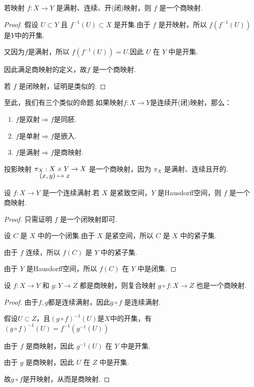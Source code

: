 \begin{proposition}[][prop:8.2]
    若映射 $f:X\to Y$ 是满射、连续、开(闭)映射，则 $f$ 是一个商映射.
\end{proposition}
\begin{proof}
    假设 $U\subset Y$ 且 $f^{-1}(U)\subset X$ 是开集.由于 $f$ 是开映射，所以 $f(f^{-1}(U))$是$Y$中的开集.\par
    又因为$f$是满射，所以 $f(f^{-1}(U))=U$.因此 $U$ 在 $Y$ 中是开集.\par
    因此满足商映射的定义，故$f$ 是一个商映射.
    \par
    若 $f$ 是闭映射，证明是类似的.
\end{proof}
\begin{remark}
    至此，我们有三个类似的命题.如果映射$f:X\to Y$是连续开(闭)映射，那么：
    \begin{enumerate}
        \item $f$是双射$\Rightarrow f$是同胚.
        \item $f$是单射$\Rightarrow f$是嵌入.
        \item $f$是满射$\Rightarrow f$是商映射.
    \end{enumerate}
\end{remark}

\begin{instance}
    投影映射 $\setjot[-2]\begin{aligned}[t]
        \pi_X:X&\times Y\to X \\
        (x,y)&\mapsto x
    \end{aligned} $ 是一个商映射，因为 $\pi_X$ 是满射、连续且开的.
\end{instance}

\begin{proposition}[][prop:8.3]
    设 $f:X\to Y$ 是一个连续满射.若 $X$ 是紧致空间，$Y$ 是Hausdorff空间，则 $f$ 是一个商映射.
\end{proposition}
\begin{proof}
    只需证明 $f$ 是一个闭映射即可.
    \par
    设 $C$ 是 $X$ 中的一个闭集.由于 $X$ 是紧空间，所以 $C$ 是 $X$ 中的紧子集.
    \par
    由于 $f$ 连续，所以 $f(C)$ 是 $Y$ 中的紧子集.
    \par
    由于 $Y$ 是Hausdorff空间，所以 $f(C)$ 在 $Y$ 中是闭集.
\end{proof}

\begin{lemma}[][lem:8.3]
    设 $f:X\to Y$ 和 $g:Y\to Z$ 都是商映射，则复合映射 $g\circ f:X\to Z$ 也是一个商映射.
\end{lemma}
\begin{proof}
    由于$f,g$都是连续满射，因此$g\circ f$ 是连续满射.\par
    假设$U\subset Z$，且$(g\circ f)^{-1}(U)$是$X$中的开集，有$(g\circ f)^{-1}(U)=f^{-1}\left(g^{-1}(U)\right)$\par
    由于 $f$ 是商映射，因此 $g^{-1}(U)$ 在 $Y$ 中是开集.
    \par
    由于 $g$ 是商映射，因此 $U$ 在 $Z$ 中是开集.\par
    故$g\circ f$是开映射，从而是商映射.
\end{proof}

